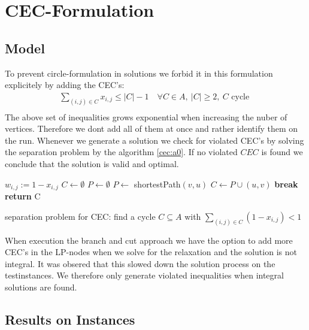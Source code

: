 \documentclass[11pt]{article}
\begin{document}
\section{CEC-Formulation}
\subsection{Model}
To prevent circle-formulation in solutions we forbid it in this formulation explicitely by adding the CEC's:
\begin{gather}
	\sum\limits_{(i,j)\in C} x_{i,j} \leq |C|-1 \quad \forall C \in A, \ |C|\geq 2,\ C\text{ cycle } \label{cec:f0}\\
\end{gather}
The above set of inequalities grows exponential when increasing the nuber of vertices. Therefore we dont add all of them at once and rather identify them on the run. Whenever we generate a solution we check for violated CEC's by solving the separation problem by the algorithm \ref{cec:a0}. If no violated $CEC$ is found we conclude that the solution is valid and optimal.


\begin{algorithm}[H]
\DontPrintSemicolon
  
  $w_{i,j} := 1-x_{i,j}$ 
  $C \leftarrow \emptyset$  
  $P \leftarrow \emptyset$  
  {
  	$P \leftarrow$ shortestPath$(v,u)$\;
  	{
  	$C \leftarrow P \cup (u,v)$\; 
  	\textbf{break}\;
  	}
  }
  \textbf{return} C\;
\caption{separation problem for CEC: find a cycle $C\subseteq A$ with $\sum\limits_{(i,j)\in C}(1-x_{i,j})<1$}
\label{cec:a0}
\end{algorithm}

When execution the branch and cut approach we have the option to add more CEC's in the LP-nodes when we solve for the relaxation and the solution is not integral. It was obsered that this slowed down the solution process on the testinstances. We therefore only generate violated inequalities when integral solutions are found.

\subsection{Results on Instances}
\end{document}
